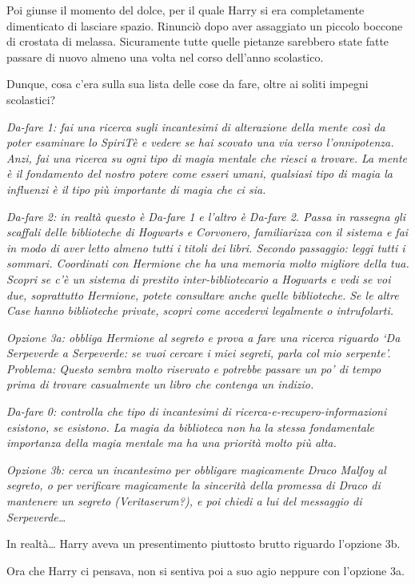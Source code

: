 Poi giunse il momento del dolce, per il quale Harry si era completamente dimenticato di lasciare spazio. Rinunciò dopo aver assaggiato un piccolo boccone di crostata di melassa. Sicuramente tutte quelle pietanze sarebbero state fatte passare di nuovo almeno una volta nel corso dell’anno scolastico.

Dunque, cosa c’era sulla sua lista delle cose da fare, oltre ai soliti impegni scolastici?

\textit{Da-fare 1: fai una ricerca sugli incantesimi di alterazione della mente così da poter esaminare lo SpiriTè e vedere se hai scovato una via verso l’onnipotenza. Anzi, fai una ricerca su ogni tipo di magia mentale che riesci a trovare. La mente è il fondamento del nostro potere come esseri umani, qualsiasi tipo di magia la influenzi è il tipo più importante di magia che ci sia.}

\textit{Da-fare 2: in realtà questo è Da-fare 1 e l’altro è Da-fare 2. Passa in rassegna gli scaffali delle biblioteche di Hogwarts e Corvonero, familiarizza con il sistema e fai in modo di aver letto almeno tutti i titoli dei libri. Secondo passaggio: leggi tutti i sommari. Coordinati con Hermione che ha una memoria molto migliore della tua. Scopri se c’è un sistema di prestito inter-bibliotecario a Hogwarts e vedi se voi due, soprattutto Hermione, potete consultare anche quelle biblioteche. Se le altre Case hanno biblioteche private, scopri come accedervi legalmente o intrufolarti.}

\textit{Opzione 3a: obbliga Hermione al segreto e prova a fare una ricerca riguardo ‘Da Serpeverde a Serpeverde: se vuoi cercare i miei segreti, parla col mio serpente’. Problema: Questo sembra molto riservato e potrebbe passare un po’ di tempo prima di trovare casualmente un libro che contenga un indizio.}

\textit{Da-fare 0: controlla che tipo di incantesimi di ricerca-e-recupero-informazioni esistono, se esistono. La magia da biblioteca non ha la stessa fondamentale importanza della magia mentale ma ha una priorità molto più alta.}

\textit{Opzione 3b: cerca un incantesimo per obbligare magicamente Draco Malfoy al segreto, o per verificare magicamente la sincerità della promessa di Draco di mantenere un segreto (Veritaserum?), e poi chiedi a lui del messaggio di Serpeverde…}

In realtà… Harry aveva un presentimento piuttosto brutto riguardo l’opzione 3b.

Ora che Harry ci pensava, non si sentiva poi a suo agio neppure con l’opzione 3a.


